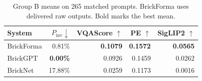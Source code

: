 \begin{table}[t]
\centering\small
\setlength{\tabcolsep}{3pt}
\begin{tabular}{lrrrr}
\toprule
System & $P_{\mathrm{inv}}\downarrow$ & VQAScore $\uparrow$ & PE $\uparrow$ & SigLIP2 $\uparrow$ \\
\midrule
BrickForma & 0.81\% & \textbf{0.1079} & \textbf{0.1572} & \textbf{0.0565} \\
BrickGPT & \textbf{0.00\%} & 0.0926 & 0.1459 & 0.0262 \\
BrickNet & 17.88\% & 0.0259 & 0.1173 & 0.0016 \\
\bottomrule
\end{tabular}
\caption{Group B means on 265 matched prompts. BrickForma uses delivered raw outputs. Bold marks the best mean.}
\label{tab:main}
\end{table}
